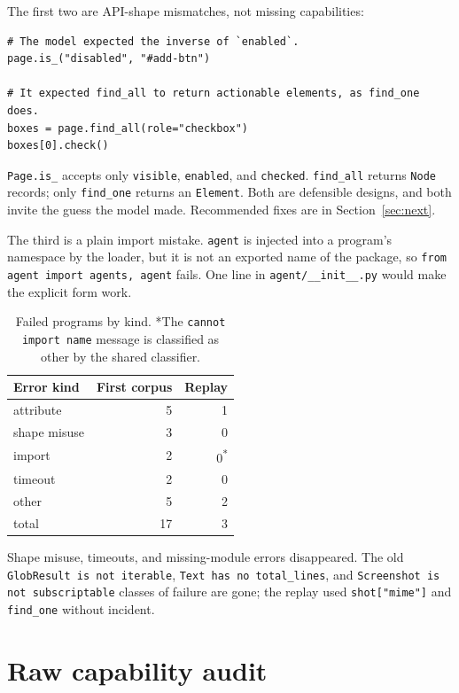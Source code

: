 \documentclass[11pt]{article}
\newcommand{\code}[1]{\texttt{#1}}
\begin{document}
The first two are API-shape mismatches, not missing capabilities:

\begin{lstlisting}[style=python]
# The model expected the inverse of `enabled`.
page.is_("disabled", "#add-btn")

# It expected find_all to return actionable elements, as find_one does.
boxes = page.find_all(role="checkbox")
boxes[0].check()
\end{lstlisting}

\code{Page.is\_} accepts only \code{visible}, \code{enabled}, and
\code{checked}. \code{find\_all} returns \code{Node} records; only
\code{find\_one} returns an \code{Element}. Both are defensible designs, and
both invite the guess the model made. Recommended fixes are in
Section~\ref{sec:next}.

The third is a plain import mistake. \code{agent} is injected into a program's
namespace by the loader, but it is not an exported name of the package, so
\code{from agent import agents, agent} fails. One line in
\code{agent/\_\_init\_\_.py} would make the explicit form work.

\begin{table}[h]
\centering
\small
\begin{tabular}{@{}lrr@{}}
\toprule
Error kind & First corpus & Replay \\
\midrule
attribute & 5 & 1 \\
shape misuse & 3 & 0 \\
import & 2 & 0\textsuperscript{*} \\
timeout & 2 & 0 \\
other & 5 & 2 \\
\midrule
total & 17 & 3 \\
\bottomrule
\end{tabular}
\caption{Failed programs by kind. *The \code{cannot import name} message is
classified as other by the shared classifier.}
\end{table}

Shape misuse, timeouts, and missing-module errors disappeared. The old
\code{GlobResult is not iterable}, \code{Text has no total\_lines}, and
\code{Screenshot is not subscriptable} classes of failure are gone; the replay
used \code{shot["mime"]} and \code{find\_one} without incident.

\section{Raw capability audit}
\label{sec:audit}
\end{document}

